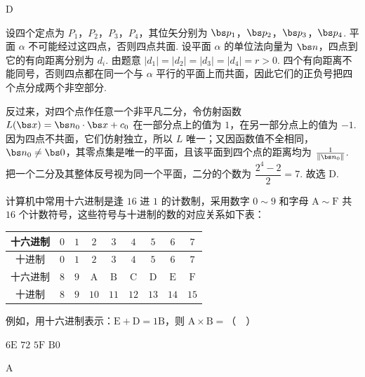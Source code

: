 \begin{answer}
D
\end{answer}

\begin{solution}
设四个定点为 \(P_1\)，\(P_2\)，\(P_3\)，\(P_4\)，其位矢分别为 \(\bs p_1\)，\(\bs p_2\)，\(\bs p_3\)，\(\bs p_4\). 平面 \(\alpha\) 不可能经过这四点，否则四点共面. 设平面 \(\alpha\) 的单位法向量为 \(\bs n\)，四点到它的有向距离分别为 \(d_i\). 由题意 \(|d_1|=|d_2|=|d_3|=|d_4|=r>0\). 四个有向距离不能同号，否则四点都在同一个与 \(\alpha\) 平行的平面上而共面，因此它们的正负号把四个点分成两个非空部分.

反过来，对四个点作任意一个非平凡二分，令仿射函数 \(L(\bs x)=\bs n_0\cdot\bs x+c_0\) 在一部分点上的值为 \(1\)，在另一部分点上的值为 \(-1\). 因为四点不共面，它们仿射独立，所以 \(L\) 唯一；又因函数值不全相同，\(\bs n_0\neq\bs0\)，其零点集是唯一的平面，且该平面到四个点的距离均为 \(\frac{1}{\lVert\bs n_0\rVert}\). 把一个二分及其整体反号视为同一个平面，二分的个数为 \(\dfrac{2^4-2}{2}=7\). 故选 D.
\end{solution}

\begin{problem}
计算机中常用十六进制是逢 \(16\) 进 \(1\) 的计数制，采用数字 \(0 \sim 9\) 和字母 \(\mathrm{A} \sim \mathrm{F}\) 共 \(16\) 个计数符号，这些符号与十进制的数的对应关系如下表：

\begin{center}
\small
\begin{tabular}{|c|c|c|c|c|c|c|c|c|}
\hline
十六进制 & \(0\) & \(1\) & \(2\) & \(3\) & \(4\) & \(5\) & \(6\) & \(7\) \\
\hline
十进制 & \(0\) & \(1\) & \(2\) & \(3\) & \(4\) & \(5\) & \(6\) & \(7\) \\
\hline
十六进制 & \(8\) & \(9\) & \(\mathrm{A}\) & \(\mathrm{B}\) & \(\mathrm{C}\) & \(\mathrm{D}\) & \(\mathrm{E}\) & \(\mathrm{F}\) \\
\hline
十进制 & \(8\) & \(9\) & \(10\) & \(11\) & \(12\) & \(13\) & \(14\) & \(15\) \\
\hline
\end{tabular}
\end{center}

例如，用十六进制表示：\(\mathrm{E} + \mathrm{D} = 1\mathrm{B}\)，则 \(\mathrm{A} \times \mathrm{B} =\)（\(\quad\)）

\choices
    {\(6\mathrm{E}\)}
    {\(72\)}
    {\(5\mathrm{F}\)}
    {\(\mathrm{B}0\)}
\end{problem}

\begin{answer}
A
\end{answer}

